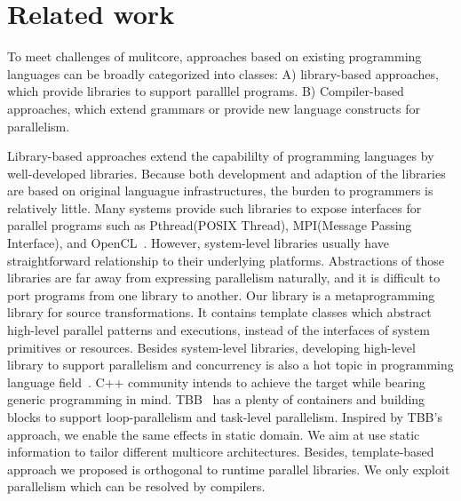 \section{Related work}\label{sec:related}
To meet challenges of mulitcore, approaches based on existing programming languages can be broadly categorized into classes: A) library-based approaches, which
provide libraries to support paralllel programs. B) Compiler-based
approaches, which extend grammars or provide new language constructs for parallelism.

Library-based approaches extend the capabililty of programming languages
by well-developed libraries. Because both development and adaption of
the libraries are based on original languague infrastructures, the
burden to programmers is relatively little. Many systems provide
such libraries to expose interfaces for parallel programs such as Pthread(POSIX Thread), MPI(Message Passing Interface), and OpenCL~\cite{opencl}. However, system-level libraries usually have straightforward relationship to
their underlying platforms. Abstractions
of those libraries are far away from expressing parallelism
naturally, and it is difficult to
port programs from one library to another. Our library is a
metaprogramming library for source transformations. It contains template classes which abstract high-level parallel patterns
and executions, instead of the interfaces of system primitives or
resources. Besides system-level libraries, developing high-level
library to support parallelism and concurrency is also a hot topic in
programming language field~\cite{javacon, wincon}. C++ community intends to
achieve the target while bearing generic programming in mind.  TBB~\cite{tbb} has a plenty of
containers and building blocks to support loop-parallelism and
task-level parallelism.  Inspired by TBB's approach, we enable the
same effects in static domain. We aim at use static information
to tailor different multicore architectures. Besides, template-based
approach we proposed is orthogonal to runtime parallel libraries. We only exploit parallelism which can be resolved by compilers.


